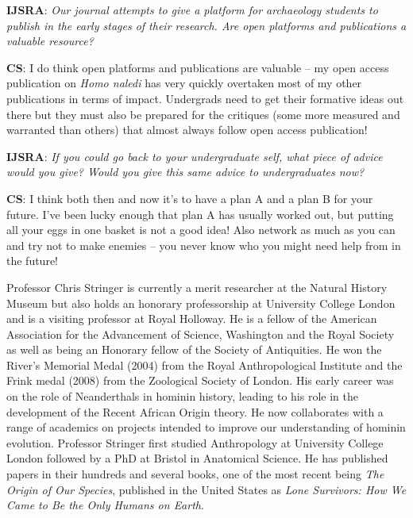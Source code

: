\documentclass{ijsra}
\begin{document}
\textbf{IJSRA}: \textit{Our journal attempts to give a platform for archaeology students to publish in the early stages of their research.
Are open platforms and publications a valuable resource?}

\textbf{CS}: I do think open platforms and publications are valuable – my open access publication on \textit{Homo naledi} has
very quickly overtaken most of my other publications in terms of impact.
Undergrads need to get their formative ideas out there but they must also be prepared for the critiques
(some more measured and warranted than others) that almost always follow open access publication!

\textbf{IJSRA}: \textit{If you could go back to your undergraduate self, what piece of advice would you give?
Would you give this same advice to undergraduates now?}

\textbf{CS}: I think both then and now it’s to have a plan A and a plan B for your future.
I’ve been lucky enough that plan A has usually worked out, but putting all your eggs in one basket is not a good idea!
Also network as much as you can and try not to make enemies – you never know who you might need help from in the future!

Professor Chris Stringer is currently a merit researcher at the Natural History Museum but also holds
an honorary professorship at University College London and is a visiting professor at Royal Holloway.
He is a fellow of the American Association for the Advancement of Science, Washington and the Royal Society as well as
being an Honorary fellow of the Society of Antiquities. 
He won the River’s Memorial Medal (2004) from the Royal Anthropological Institute and the Frink medal (2008) from
the Zoological Society of London. His early career was on the role of Neanderthals in hominin history,
leading to his role in the development of the Recent African Origin theory.
He now collaborates with a range of academics on projects intended to improve our understanding of hominin evolution.
Professor Stringer first studied Anthropology at University College London followed by a PhD at Bristol in Anatomical Science.
He has published papers in their hundreds and several books, one of the most recent being \textit{The Origin of Our Species},
published in the United States as \textit{Lone Survivors: How We Came to Be the Only Humans on Earth}.

\IJSRAclosing
\end{document}
